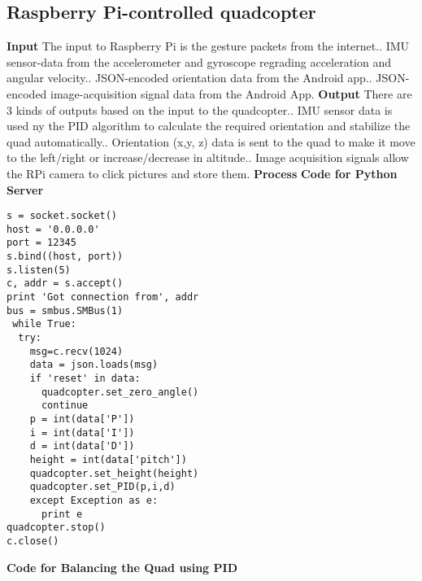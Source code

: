 \subsection{Raspberry Pi-controlled quadcopter}
\noindent
\textbf{Input}\newline
The input to Raspberry Pi is the gesture packets from the internet.. IMU sensor-data from the accelerometer and gyroscope regrading acceleration and angular velocity.. JSON-encoded orientation data from the Android app.. JSON-encoded image-acquisition signal data from the Android App.\newline
\newline
\textbf{Output}\newline
There are 3 kinds of outputs based on the input to the quadcopter.. IMU sensor data is used ny the PID algorithm to calculate the required orientation and stabilize the quad automatically.. Orientation (x,y, z) data is sent to the quad to make it move to the left/right or increase/decrease in altitude.. Image acquisition signals allow the RPi camera to click pictures and store them.\newline
\newline
\textbf{Process}\newline
\textbf{Code for Python Server}\newline
\begin{lstlisting}
s = socket.socket()       
host = '0.0.0.0'      
port = 12345          
s.bind((host, port)) 
s.listen(5)          
c, addr = s.accept() 
print 'Got connection from', addr
bus = smbus.SMBus(1)
 while True:
  try:
    msg=c.recv(1024)
    data = json.loads(msg)
    if 'reset' in data:
      quadcopter.set_zero_angle()
      continue
    p = int(data['P'])
    i = int(data['I'])
    d = int(data['D'])
    height = int(data['pitch'])
    quadcopter.set_height(height)
    quadcopter.set_PID(p,i,d)
    except Exception as e:
      print e
quadcopter.stop()
c.close()      
\end{lstlisting} 
\textbf{Code for Balancing the Quad using PID}\newline
